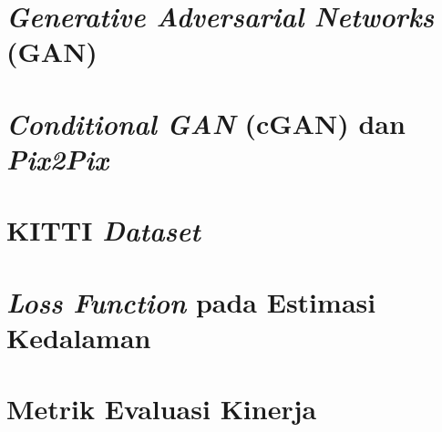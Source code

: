 \section{\textit{Generative Adversarial Networks} (GAN)}

\section{\textit{Conditional GAN} (cGAN) dan \textit{Pix2Pix}}

\section{KITTI \textit{Dataset}}

\section{\textit{Loss Function} pada Estimasi Kedalaman}

\section{Metrik Evaluasi Kinerja}